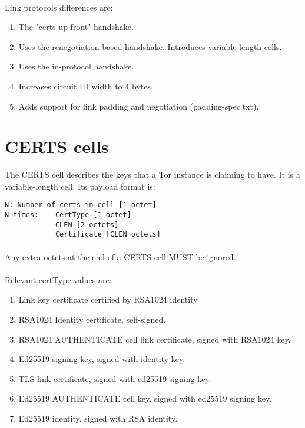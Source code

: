 \paragraph{}
Link protocols differences are:
\begin{enumerate}
    \item The "certs up front" handshake.
    \item Uses the renegotiation-based handshake. Introduces
          variable-length cells.
    \item Uses the in-protocol handshake.
    \item Increases circuit ID width to 4 bytes.
    \item Adds support for link padding and negotiation (padding-spec.txt).
\end{enumerate}


\section{CERTS cells}
The CERTS cell describes the keys that a Tor instance is claiming
to have. It is a variable-length cell. Its payload format is:

\begin{verbatim}
N: Number of certs in cell [1 octet]
N times:    CertType [1 octet]
            CLEN [2 octets]
            Certificate [CLEN octets]
\end{verbatim}

\paragraph{}
Any extra octets at the end of a CERTS cell MUST be ignored.

\paragraph{}
Relevant certType values are:
\begin{enumerate}
    \item Link key certificate certified by RSA1024 identity
    \item RSA1024 Identity certificate, self-signed.
    \item RSA1024 AUTHENTICATE cell link certificate, signed with RSA1024 key.
    \item Ed25519 signing key, signed with identity key.
    \item TLS link certificate, signed with ed25519 signing key.
    \item Ed25519 AUTHENTICATE cell key, signed with ed25519 signing key.
    \item Ed25519 identity, signed with RSA identity.
\end{enumerate}

